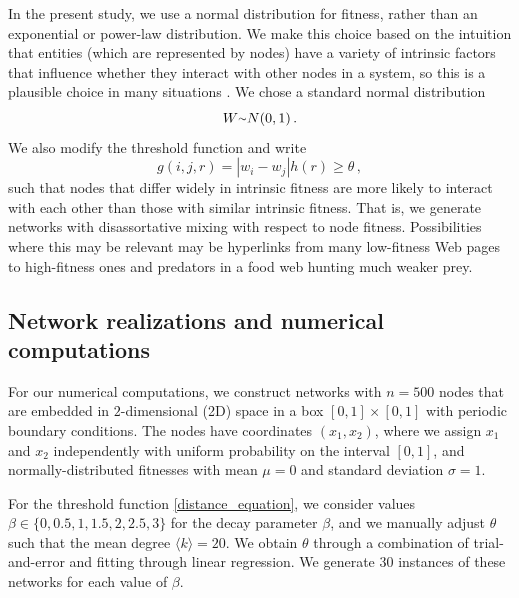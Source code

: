 \documentclass[%
 reprint,
 amsmath,amssymb,
 aps,
]{revtex4-1}
\begin{document}
In the present study, we use a normal distribution for fitness, rather than an exponential or power-law distribution. We make this choice based on the intuition that entities (which are represented by nodes) have a variety of intrinsic factors that influence whether they interact with other nodes in a system, so this is a plausible choice in many situations \cite{frank}. 
We chose a standard normal distribution
\begin{equation}
	    W {\raise.17ex\hbox{$\scriptstyle\mathtt{\sim}$}} N(0, 1)\,.
\end{equation}
We also modify the threshold function and write
\begin{equation}
    g(i, j, r) = |w_i - w_j| h(r) \geq \theta\,,
\end{equation}
such that nodes that differ widely in intrinsic fitness are more likely to interact with each other than those with similar intrinsic fitness. That is, we generate networks with disassortative mixing with respect to node fitness. Possibilities where this may be relevant may be hyperlinks from many low-fitness Web pages to high-fitness ones and predators in a food web hunting much weaker prey.


\subsection{Network realizations and numerical computations}\label{sec:fitness_numerics}

For our numerical computations, we construct networks with $n = 500$ nodes that are embedded in $2$-dimensional (2D) space in a box $[0, 1] \times [0, 1]$ with periodic boundary conditions. The nodes have coordinates $(x_1, x_2)$, where we assign $x_1$ and $x_2$ independently with uniform probability on the interval $[0,1]$, and normally-distributed fitnesses with mean $\mu = 0$ and standard deviation $\sigma = 1$. 

For the threshold function \eqref{distance_equation}, we consider values $\beta \in \{ 0, 0.5, 1, 1.5, 2, 2.5, 3 \}$ for the decay parameter $\beta$, and we manually adjust $\theta$ such that the mean degree $\langle k \rangle = 20$. We obtain $\theta$ through a combination of trial-and-error and fitting through linear regression. We generate $30$ instances of these networks for each value of $\beta$.
\end{document}
